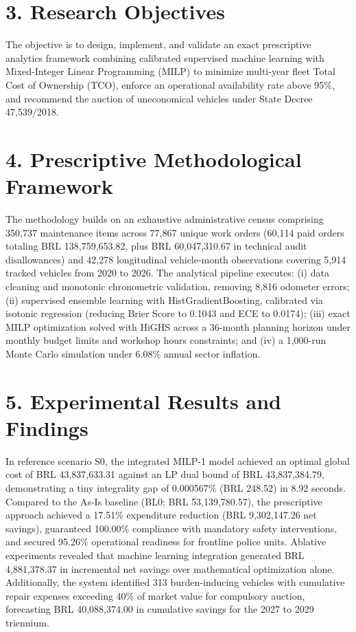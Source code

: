 \documentclass[10pt,a4paper,journal]{article}
\begin{document}
\section{3. Research Objectives}
The objective is to design, implement, and validate an exact prescriptive analytics framework combining calibrated supervised machine learning with Mixed-Integer Linear Programming (MILP) to minimize multi-year fleet Total Cost of Ownership (TCO), enforce an operational availability rate above 95\%, and recommend the auction of uneconomical vehicles under State Decree 47,539/2018.

\section{4. Prescriptive Methodological Framework}
The methodology builds on an exhaustive administrative census comprising 350,737 maintenance items across 77,867 unique work orders (60,114 paid orders totaling BRL 138,759,653.82, plus BRL 60,047,310.67 in technical audit disallowances) and 42,278 longitudinal vehicle-month observations covering 5,914 tracked vehicles from 2020 to 2026. The analytical pipeline executes: (i) data cleaning and monotonic chronometric validation, removing 8,816 odometer errors; (ii) supervised ensemble learning with HistGradientBoosting, calibrated via isotonic regression (reducing Brier Score to 0.1043 and ECE to 0.0174); (iii) exact MILP optimization solved with HiGHS across a 36-month planning horizon under monthly budget limits and workshop hours constraints; and (iv) a 1,000-run Monte Carlo simulation under 6.08\% annual sector inflation.

\section{5. Experimental Results and Findings}
In reference scenario S0, the integrated MILP-1 model achieved an optimal global cost of BRL 43,837,633.31 against an LP dual bound of BRL 43,837,384.79, demonstrating a tiny integrality gap of 0.000567\% (BRL 248.52) in 8.92 seconds. Compared to the As-Is baseline (BL0: BRL 53,139,780.57), the prescriptive approach achieved a 17.51\% expenditure reduction (BRL 9,302,147.26 net savings), guaranteed 100.00\% compliance with mandatory safety interventions, and secured 95.26\% operational readiness for frontline police units. Ablative experiments revealed that machine learning integration generated BRL 4,881,378.37 in incremental net savings over mathematical optimization alone. Additionally, the system identified 313 burden-inducing vehicles with cumulative repair expenses exceeding 40\% of market value for compulsory auction, forecasting BRL 40,088,374.00 in cumulative savings for the 2027 to 2029 triennium.
\end{document}

